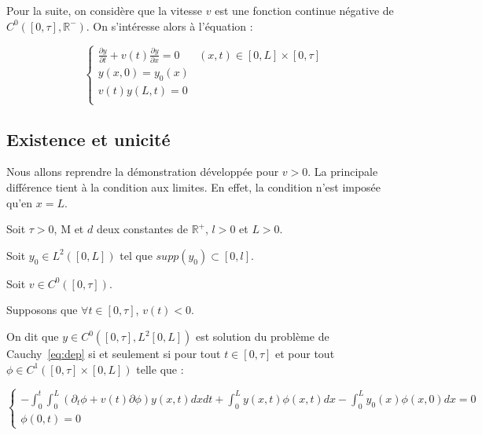 \documentclass[a4paper]{article}
\newcommand{\mass}{\mathrm{M}}
\newcommand{\dep}{d}
\begin{document}
Pour la suite, on considère que la vitesse $v$ est une fonction continue négative de $C^0([0,\tau],\mathbb{R}^-)$.
On s'intéresse alors à l'équation :

\begin{equation}
		\label{eq:dep}
		\begin{cases}
			\displaystyle \frac{\partial y}{\partial t}+ v(t) \frac{\partial y} {\partial x}  = 0 & (x,t) \in [0,L] \times [0, \tau] \\
             y(x,0) = y_{0} (x) \\
			 v(t)y(L,t) = 0 \\
		\end{cases}
\end{equation}



\subsection{Existence et unicité}

Nous allons reprendre la démonstration développée pour $v>0$.
La principale différence tient à la condition aux limites.
En effet, la condition n'est imposée qu'en $x=L$.

\begin{definition}
	\label{def:cauchyd}
	Soit $\tau>0$, $\mass$ et $\dep$ deux constantes de $\mathbb{R}^+$, 
	$l>0$ et $L>0$. 
	
	Soit $y_0 \in L^2([0,L])$ tel que $supp(y_0) \subset [0,l]$.
	
	Soit $v \in C^0([0,\tau])$.
	
	Supposons que $\forall t \in[0,\tau]$, $v(t)<0$.
	
	On dit que $y \in C^0([0,\tau],L^2[0,L])$ est solution du problème de Cauchy~\eqref{eq:dep}  
	si et seulement si pour tout $t \in [0,\tau]$ et pour
	tout $\phi \in C^1([0,\tau]\times [0,L])$ telle que :
	
	\begin{equation}
		\begin{cases}
			-\int_0^t \int_0^L (\partial_t \phi +v(t)\partial \phi) y(x,t) dxdt 
			+ \int_0^L y(x,t) \phi (x,t) dx - \int_0^L y_0(x)\phi(x,0)dx =0 \\
			\phi(0,t)=0
		\end{cases}
	\end{equation}
	
\end{definition}
\end{document}
